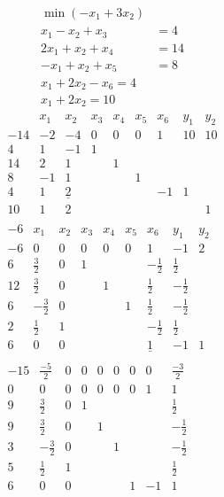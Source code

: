 \begin{example}
\begin{align*}
\min(-x_1 + 3x_2 ) \\
x_1 - x_2 + x_3 &= 4 \\
2x_1 + x_2 + x_4 &= 14 \\
-x_1 + x_2 + x_5 &= 8 \\
x_1 + 2x_2 -x_6 = 4 \\
x_1 + 2x_2 = 10
\end{align*}
\begin{align*}
\begin{matrix}
	& x_1 & x_2 & x_3 & x_4 & x_5 & x_6 & y_1 & y_2\\
-14	& -2 & -4 & 0 & 0 & 0 & 1 & 1 0 & 1 0 \\
4 	& 1 & -1 & 1 \\
14	& 2 & 1 & & 1 \\
8	& -1 & 1 & & & 1\\
4	& 1 & \underline{2} & & & &-1 & 1\\
10	& 1 & 2 & & & & & &1
\end{matrix}\\
\begin{matrix}
-6	& x_1 & x_2 & x_3 & x_4 & x_5 & x_6 & y_1 & y_2\\
-6	& 0 & 0 & 0 & 0 & 0 & 1 & -1 & 2 \\
6 	& \tfrac{3}{2} & 0 & 1 & & & -\tfrac{1}{2} & \tfrac{1}{2}\\
12	& \tfrac{3}{2} & 0 & & 1 & & \tfrac{1}{2} & -\tfrac{1}{2}\\
6	& -\tfrac{3}{2} & 0 & & & 1 & \tfrac{1}{2} & -\tfrac{1}{2}\\
2	& \tfrac{1}{2} & 1 & & & & -\tfrac{1}{2} & \tfrac{1}{2}\\
6	& 0 & 0 & & & & \underline{1} & -1 &1
\end{matrix}\\
\begin{matrix}
-15	& \tfrac{-5}{2} & 0 & 0 & 0 & 0 & 0 & 0 & \tfrac{-3}{2}\\
0	& 0 & 0 & 0 & 0 & 0 & 0 & 1 & 1 \\
9 	& \tfrac{3}{2} & 0 & 1 & & & & & \tfrac{1}{2}\\
9	& \tfrac{3}{2} & 0 & & 1 & & & & -\tfrac{1}{2}\\
3	& -\tfrac{3}{2} & 0 & & & 1 & & & -\tfrac{1}{2}\\
5	& \tfrac{1}{2} & 1 & & & & & & \tfrac{1}{2}\\
6	& 0 & 0 & & & & 1  & -1 &1
\end{matrix}\\

\end{align*}
\end{example}
